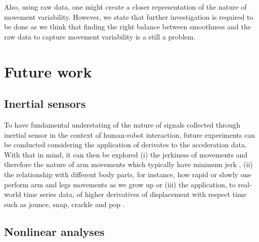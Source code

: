 Also, using raw data, one might create a closer representation of the 
nature of movement variability.
However, we state that further investigation is required to be done
as we think that finding the right balance between 
smoothness and the raw data to capture movement variability is 
a still a problem.


\section{Future work}

\subsection*{Inertial sensors}
To have fundamental understating of the nature of signals collected 
through inertial sensor in the context of human-robot interaction,
future experiments can be conducted considering the application of 
derivates to the acceleration data. 
With that in mind, it can then be explored 
(i) the jerkiness of movements and therefore the nature of arm movements 
which typically have minimum jerk \citep{flash1985},
(ii) the relationship with different body parts, for instance, 
how rapid or slowly one perform arm and legs movements as we grow up 
\citep{devries1982, mori2012} or (iii) 
the application, to real-world time series data, of higher derivatives 
of displacement with respect time such as jounce, snap, 
crackle and pop \citep{eager2016}.

%




\subsection*{Nonlinear analyses}

